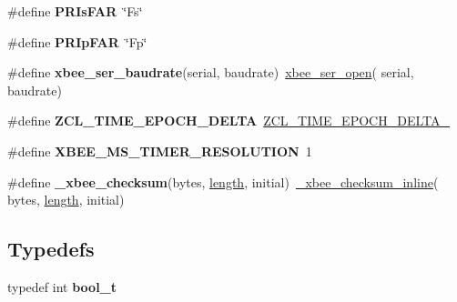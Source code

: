 \begin{DoxyCompactItemize}
\mbox{\label{group__hal__rabbit_ga379022d2cd3136d8f3500c88658056b7}} 
\#define {\bfseries P\+R\+Is\+F\+AR}~\char`\"{}Fs\char`\"{}
\item 
\mbox{\label{group__hal__rabbit_ga8429a3beb3448b89cb7c3877b8909369}} 
\#define {\bfseries P\+R\+Ip\+F\+AR}~\char`\"{}Fp\char`\"{}
\item 
\mbox{\label{group__hal__rabbit_gaaa4b5b262a136fb7f4dee6817f094576}} 
\#define {\bfseries xbee\+\_\+ser\+\_\+baudrate}(serial,  baudrate)~\hyperlink{group__xbee__serial_gaa615a221dd69c17ee2989c281f2bf04a}{xbee\+\_\+ser\+\_\+open}( serial, baudrate)
\item 
\mbox{\label{group__hal__rabbit_ga503caf44f78cc52dc196c413cd6c78ab}} 
\#define {\bfseries Z\+C\+L\+\_\+\+T\+I\+M\+E\+\_\+\+E\+P\+O\+C\+H\+\_\+\+D\+E\+L\+TA}~\hyperlink{group__hal_gaa1c89a351daab5e3d33a2dc48f85f9a4}{Z\+C\+L\+\_\+\+T\+I\+M\+E\+\_\+\+E\+P\+O\+C\+H\+\_\+\+D\+E\+L\+T\+A\+\_}
\item 
\mbox{\label{group__hal__rabbit_ga5cbeea4d9344138b657f78ad38813584}} 
\#define {\bfseries X\+B\+E\+E\+\_\+\+M\+S\+\_\+\+T\+I\+M\+E\+R\+\_\+\+R\+E\+S\+O\+L\+U\+T\+I\+ON}~1
\item 
\mbox{\label{group__hal__rabbit_gaf6deb539ce1ad71e3dfcbaeb8086a0e7}} 
\#define {\bfseries \+\_\+xbee\+\_\+checksum}(bytes,  \hyperlink{group__zdo_gab2b3adeb2a67e656ff030b56727fd0ac}{length},  initial)~\hyperlink{group__hal__rabbit_ga02da89986736815045b1a11e1c58733e}{\+\_\+xbee\+\_\+checksum\+\_\+inline}( bytes, \hyperlink{group__zdo_gab2b3adeb2a67e656ff030b56727fd0ac}{length}, initial)
\end{DoxyCompactItemize}
\subsection*{Typedefs}
\begin{DoxyCompactItemize}
\item 
\mbox{\label{group__hal__rabbit_ga812d16e5494522586b3784e55d479912}} 
typedef int {\bfseries bool\+\_\+t}
\end{DoxyCompactItemize}
